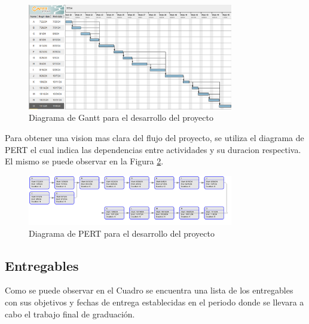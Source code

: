 \documentclass[12pt]{article}
\begin{document}
\begin{figure}[h!]
  \centering
  \includegraphics[width=0.8\textwidth]{diagramas/gantt.png}
  \caption{Diagrama de Gantt para el desarrollo del proyecto}
  \label{fig:gantt}
\end{figure}

Para obtener una vision mas clara del flujo del proyecto, se utiliza el diagrama de PERT el cual indica las dependencias entre actividades y su duracion respectiva. El mismo se puede observar en la Figura \ref{fig:pert}.

\begin{figure}[h!]
  \centering
  \includegraphics[width=0.8\textwidth]{diagramas/pert.png}
  \caption{Diagrama de PERT para el desarrollo del proyecto}
  \label{fig:pert}
\end{figure}

\subsection{Entregables}

Como se puede observar en el Cuadro se encuentra una lista de los entregables con sus objetivos y fechas de entrega establecidas en el periodo donde se llevara a cabo el trabajo final de graduación.
\end{document}
